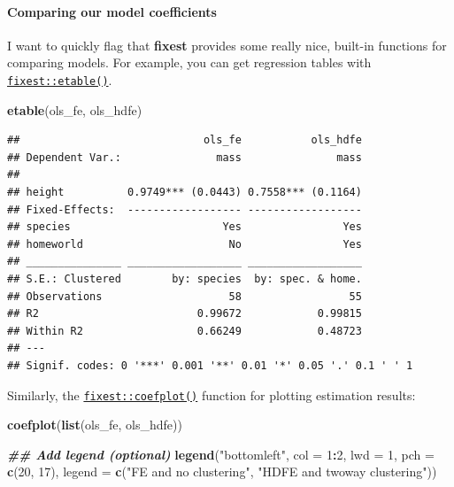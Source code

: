 \documentclass[
]{article}
\newenvironment{Shaded}{\begin{snugshade}}{\end{snugshade}}
\newcommand{\AttributeTok}[1]{\textcolor[rgb]{0.13,0.29,0.53}{#1}}
\newcommand{\DecValTok}[1]{\textcolor[rgb]{0.00,0.00,0.81}{#1}}
\newcommand{\DocumentationTok}[1]{\textcolor[rgb]{0.56,0.35,0.01}{\textbf{\textit{#1}}}}
\newcommand{\FunctionTok}[1]{\textcolor[rgb]{0.13,0.29,0.53}{\textbf{#1}}}
\newcommand{\NormalTok}[1]{#1}
\newcommand{\SpecialCharTok}[1]{\textcolor[rgb]{0.81,0.36,0.00}{\textbf{#1}}}
\newcommand{\StringTok}[1]{\textcolor[rgb]{0.31,0.60,0.02}{#1}}
\begin{document}
\hypertarget{comparing-our-model-coefficients}{%
\paragraph{Comparing our model
coefficients}\label{comparing-our-model-coefficients}}

I want to quickly flag that \textbf{fixest} provides some really nice,
built-in functions for comparing models. For example, you can get
regression tables with
\href{https://lrberge.github.io/fixest/articles/exporting_tables.html}{\texttt{fixest::etable()}}.

\begin{Shaded}
\begin{Highlighting}[]
\FunctionTok{etable}\NormalTok{(ols\_fe, ols\_hdfe)}
\end{Highlighting}
\end{Shaded}

\begin{verbatim}
##                             ols_fe           ols_hdfe
## Dependent Var.:               mass               mass
##                                                      
## height          0.9749*** (0.0443) 0.7558*** (0.1164)
## Fixed-Effects:  ------------------ ------------------
## species                        Yes                Yes
## homeworld                       No                Yes
## _______________ __________________ __________________
## S.E.: Clustered        by: species  by: spec. & home.
## Observations                    58                 55
## R2                         0.99672            0.99815
## Within R2                  0.66249            0.48723
## ---
## Signif. codes: 0 '***' 0.001 '**' 0.01 '*' 0.05 '.' 0.1 ' ' 1
\end{verbatim}

Similarly, the
\href{https://lrberge.github.io/fixest/reference/coefplot.html}{\texttt{fixest::coefplot()}}
function for plotting estimation results:

\begin{Shaded}
\begin{Highlighting}[]
\FunctionTok{coefplot}\NormalTok{(}\FunctionTok{list}\NormalTok{(ols\_fe, ols\_hdfe))}

\DocumentationTok{\#\# Add legend (optional)}
\FunctionTok{legend}\NormalTok{(}\StringTok{"bottomleft"}\NormalTok{, }\AttributeTok{col =} \DecValTok{1}\SpecialCharTok{:}\DecValTok{2}\NormalTok{, }\AttributeTok{lwd =} \DecValTok{1}\NormalTok{, }\AttributeTok{pch =} \FunctionTok{c}\NormalTok{(}\DecValTok{20}\NormalTok{, }\DecValTok{17}\NormalTok{),}
       \AttributeTok{legend =} \FunctionTok{c}\NormalTok{(}\StringTok{"FE and no clustering"}\NormalTok{, }\StringTok{"HDFE and twoway clustering"}\NormalTok{))}
\end{Highlighting}
\end{Shaded}
\end{document}
